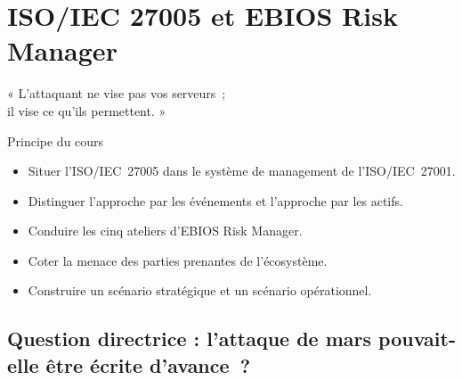 
\chapter{ISO/IEC 27005 et EBIOS Risk Manager}
\label{chap:ebios}

\epigraph{%
    « L'attaquant ne vise pas vos serveurs~;\\
    il vise ce qu'ils permettent. »%
}{Principe du cours}


\begin{boxobjectifs}
\begin{itemize}
    \item Situer l'ISO/IEC~27005 dans le système de management de
          l'ISO/IEC~27001.
    \item Distinguer l'approche par les événements et l'approche par les
          actifs.
    \item Conduire les cinq ateliers d'EBIOS Risk Manager.
    \item Coter la menace des parties prenantes de l'écosystème.
    \item Construire un scénario stratégique et un scénario opérationnel.
\end{itemize}
\end{boxobjectifs}

\bigskip

\section*{Question directrice : l'attaque de mars pouvait-elle être écrite d'avance~?}

